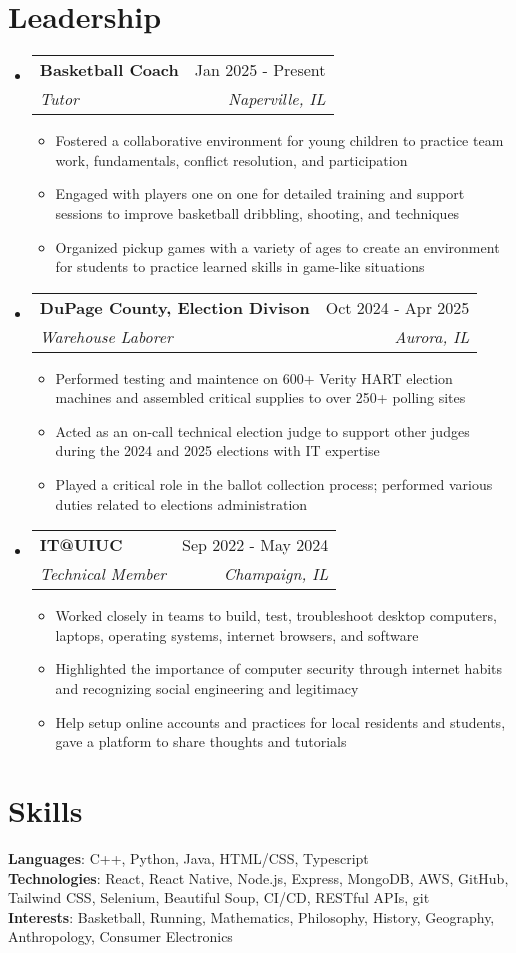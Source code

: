 \documentclass[letterpaper,11pt]{article}
\makeatletter
\newcommand{\resumeItem}[1]{
  \item\footnotesize{#1}
    {\vspace{-2pt}}
  }
\newcommand{\resumeSubheading}[4]{
  \vspace{-2pt}\item
    \begin{tabular*}{0.97\textwidth}[t]{l@{\extracolsep{\fill}}r}
      \textbf{\small#1} & \small#2 \\
      \textit{\footnotesize#3} & \textit{\footnotesize #4} \\
    \end{tabular*}\vspace{-7pt}
}
\newcommand{\resumeSubHeadingListStart}{\begin{itemize}[leftmargin=0.15in, label={}]}
\newcommand{\resumeSubHeadingListEnd}{\end{itemize}}
\newcommand{\resumeItemListStart}{\begin{itemize}[leftmargin=*]\vspace{-2pt}}
\newcommand{\resumeItemListEnd}{\end{itemize}\vspace{-5pt}}
\makeatother
\begin{document}
\section{Leadership}
  \resumeSubHeadingListStart

    \resumeSubheading
    {Basketball Coach}{Jan 2025 - Present}
    {Tutor}{Naperville, IL}
    \resumeItemListStart
      \resumeItem{Fostered a collaborative environment for young children to practice team work, fundamentals, conflict resolution, and participation}
      \resumeItem{Engaged with players one on one for detailed training and support sessions to improve basketball dribbling, shooting, and techniques}
      \resumeItem{Organized pickup games with a variety of ages to create an environment for students to practice learned skills in game-like situations}
  \resumeItemListEnd

    \resumeSubheading
    {DuPage County, Election Divison}{Oct 2024 - Apr 2025}
    {Warehouse Laborer}{Aurora, IL}
    \resumeItemListStart
      \resumeItem{Performed testing and maintence on 600+ Verity HART election machines and assembled critical supplies to over 250+ polling sites}
      \resumeItem{Acted as an on-call technical election judge to support other judges during the 2024 and 2025 elections with IT expertise}
      \resumeItem{Played a critical role in the ballot collection process; performed various duties related to elections administration}
  \resumeItemListEnd

    \resumeSubheading
    {IT@UIUC}{Sep 2022 - May 2024}
    {Technical Member}{Champaign, IL}
    \resumeItemListStart
      \resumeItem{Worked closely in teams to build, test, troubleshoot desktop computers, laptops, operating systems, internet browsers, and software}
      \resumeItem{Highlighted the importance of computer security through internet habits and recognizing social engineering and legitimacy}
      \resumeItem{Help setup online accounts and practices for local residents and students, gave a platform to share thoughts and tutorials}
  \resumeItemListEnd

\resumeSubHeadingListEnd

\section{Skills}
\begin{itemize}[leftmargin=0.15in, label={}]
   \footnotesize{\item{
    \textbf{Languages}{: C++, Python, Java, HTML/CSS, Typescript} \\
    \textbf{Technologies}{: React, React Native, Node.js, Express, MongoDB, AWS, GitHub, Tailwind CSS, Selenium, Beautiful Soup, CI/CD, RESTful APIs, git} \\
    \textbf{Interests}{: Basketball, Running, Mathematics, Philosophy, History, Geography, Anthropology, Consumer Electronics}
   }}
\end{itemize}
\end{document}
